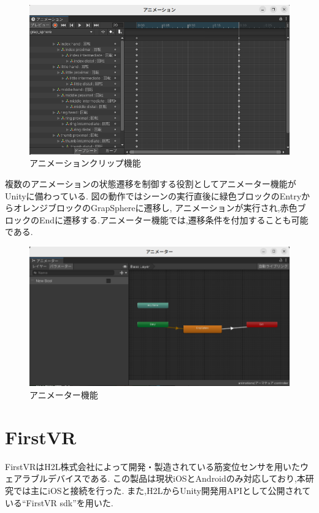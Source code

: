 \documentclass{ltjsreport}
\begin{document}
			\begin{figure}[H]
			\centering
			\includegraphics[width = 12cm]{../figs/animationclip.png}
			\caption{アニメーションクリップ機能}
			\label{fig:animationclip}
			\end{figure}
\vspace{-15pt}
			複数のアニメーションの状態遷移を制御する役割としてアニメーター機能がUnityに備わっている.
			図の動作ではシーンの実行直後に緑色ブロックのEntryからオレンジブロックのGrapSphereに遷移し,
			アニメーションが実行され,赤色ブロックのEndに遷移する.アニメーター機能では,遷移条件を付加することも可能である.

			\begin{figure}[H]
			\centering
			\includegraphics[width = 12cm]{../figs/animaterexample.png}
			\caption{アニメーター機能}
			\label{fig:animater}
			\end{figure}
\vspace{-15pt}
	\section{FirstVR}
		FirstVRはH2L株式会社\cite{ref:5}によって開発・製造されている筋変位センサを用いたウェアラブルデバイスである.
		この製品は現状iOSとAndroidのみ対応しており,本研究では主にiOSと接続を行った.
		また,H2LからUnity開発用APIとして公開されている``FirstVR sdk''を用いた.
\end{document}
